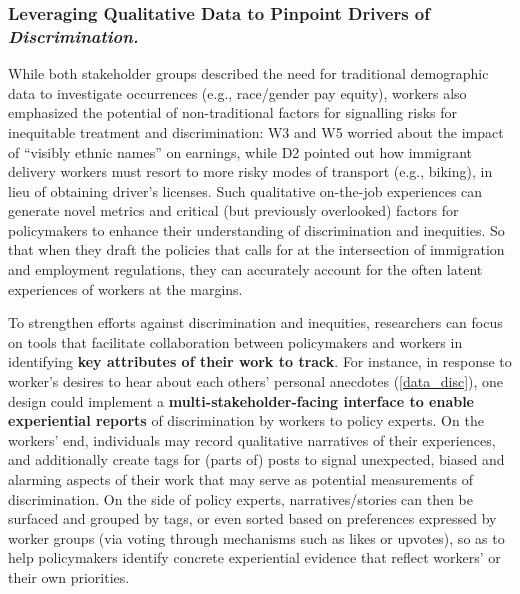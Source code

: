 \subsubsection{\textbf{{Leveraging Qualitative Data to Pinpoint Drivers of \textit{Discrimination.}}}}
{
While both stakeholder groups described the need for traditional demographic data to investigate occurrences (e.g., race/gender pay equity), workers also emphasized the potential of non-traditional factors for signalling risks for inequitable treatment and discrimination: W3 and W5 worried about the impact of ``visibly ethnic names'' on earnings, while D2 pointed out how immigrant delivery workers must resort to more risky modes of transport (e.g., biking), in lieu of obtaining driver's licenses. 
Such qualitative on-the-job experiences can generate novel metrics and critical (but previously overlooked) factors for policymakers to enhance their understanding of discrimination and inequities. So that when they draft the policies that \citet{van2023migration} calls for at the intersection of immigration and employment regulations, they can accurately account for the often latent experiences of workers at the margins. 

To strengthen efforts against discrimination and inequities, researchers can focus on tools that facilitate collaboration between policymakers and workers in identifying \textbf{key attributes of their work to track}. 
For instance, in response to worker's desires to hear about each others' personal anecdotes (\ref{data_disc}), one design could implement a \textbf{multi-stakeholder-facing interface to enable experiential reports} of discrimination by workers to policy experts.
On the workers' end, individuals may record qualitative narratives of their experiences, and additionally create tags for (parts of) posts to signal unexpected, biased and alarming aspects of their work that may serve as potential measurements of discrimination. 
On the side of policy experts, narratives/stories can then be surfaced and grouped by tags, or even sorted based on preferences expressed by worker groups (via voting through mechanisms such as likes or upvotes), so as to help policymakers identify concrete experiential evidence that reflect workers' or their own priorities.
}

